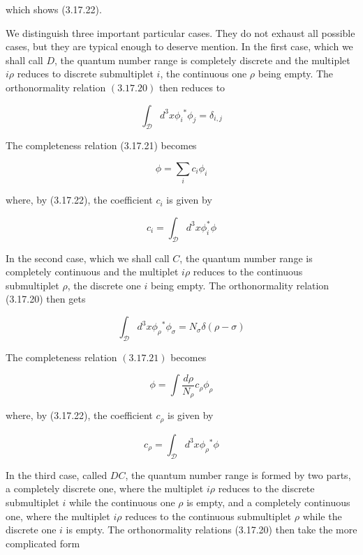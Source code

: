 \documentclass{article}
\begin{document}
which shows (3.17.22).

We distinguish three important particular cases. They do not exhaust all possible cases, but they are typical enough to deserve mention. In the first case, which we shall call $D$, the quantum number range is completely discrete and the multiplet $i \rho$ reduces to discrete submultiplet $i$, the continuous one $\rho$ being empty. The orthonormality relation $(3.17 .20)$ then reduces to
 
\begin{equation*}
\int_{\mathcal{D}} d^{3} x \phi_{i}{ }^{*} \phi_{j}=\delta_{i, j} \tag{3.17.24}
\end{equation*}
 

The completeness relation (3.17.21) becomes
 
\begin{equation*}
\phi=\sum_{i} c_{i} \phi_{i} \tag{3.17.25}
\end{equation*}
 
where, by (3.17.22), the coefficient $c_{i}$ is given by
 
\begin{equation*}
c_{i}=\int_{\mathcal{D}} d^{3} x \phi_{i}^{*} \phi \tag{3.17.26}
\end{equation*}
 

In the second case, which we shall call $C$, the quantum number range is completely continuous and the multiplet $i \rho$ reduces to the continuous submultiplet $\rho$, the discrete one $i$ being empty. The orthonormality relation (3.17.20) then gets
 
\begin{equation*}
\int_{\mathcal{D}} d^{3} x \phi_{\rho}{ }^{*} \phi_{\sigma}=N_{\sigma} \delta(\rho-\sigma) \tag{3.17.27}
\end{equation*}
 

The completeness relation $(3.17 .21)$ becomes
 
\begin{equation*}
\phi=\int \frac{d \rho}{N_{\rho}} c_{\rho} \phi_{\rho} \tag{3.17.28}
\end{equation*}
 
where, by (3.17.22), the coefficient $c_{\rho}$ is given by
 
\begin{equation*}
c_{\rho}=\int_{\mathcal{D}} d^{3} x \phi_{\rho}{ }^{*} \phi \tag{3.17.29}
\end{equation*}
 

In the third case, called $D C$, the quantum number range is formed by two parts, a completely discrete one, where the multiplet $i \rho$ reduces to the discrete submultiplet $i$ while the continuous one $\rho$ is empty, and a completely continuous one, where the multiplet $i \rho$ reduces to the continuous submultiplet $\rho$ while the discrete one $i$ is empty. The orthonormality relations (3.17.20) then take the more complicated form
 
\end{document}
